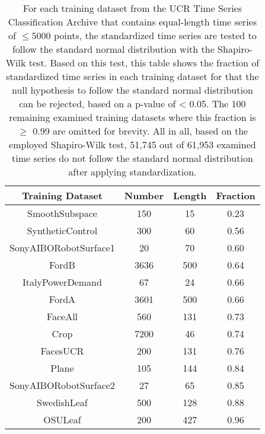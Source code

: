 \begin{table}[htb]
\centering
\begin{tabular}{|c|c|c|c|}
\hline
\textbf{Training Dataset} & \textbf{Number} & \textbf{Length} & \textbf{Fraction} \\ \hline
SmoothSubspace & 150 & 15 & 0.23 \\
SyntheticControl & 300 & 60 & 0.56 \\
SonyAIBORobotSurface1 & 20 & 70 & 0.60 \\
FordB & 3636 & 500 & 0.64 \\
ItalyPowerDemand & 67 & 24 & 0.66 \\
FordA & 3601 & 500 & 0.66 \\ 
FaceAll & 560 & 131 & 0.73 \\
Crop & 7200 & 46 & 0.74 \\
FacesUCR & 200 & 131 & 0.76 \\
Plane & 105 & 144 & 0.84 \\
SonyAIBORobotSurface2 & 27 & 65 & 0.85 \\
SwedishLeaf & 500 & 128 & 0.88 \\
OSULeaf & 200 & 427 & 0.96 \\ \hline
\end{tabular}
\vspace*{0.5cm}
\caption[UCR Time Series - Testing for Standard Normal Distribution]{For each training dataset from the UCR Time Series Classification Archive \cite{UCR_Archive} that contains equal-length time series of $\leq 5000$ points, the standardized time series are tested to follow the standard normal distribution with the Shapiro-Wilk test. Based on this test, this table shows the fraction of standardized time series in each training dataset for that the null hypothesis to follow the standard normal distribution can be rejected, based on a p-value of < 0.05. The 100 remaining examined training datasets where this fraction is $\geq$ 0.99 are omitted for brevity. All in all, based on the employed Shapiro-Wilk test, 51,745 out of 61,953 examined time series do not follow the standard normal distribution after applying standardization.}
\label{tab:shapiro_UCR}
\end{table}
